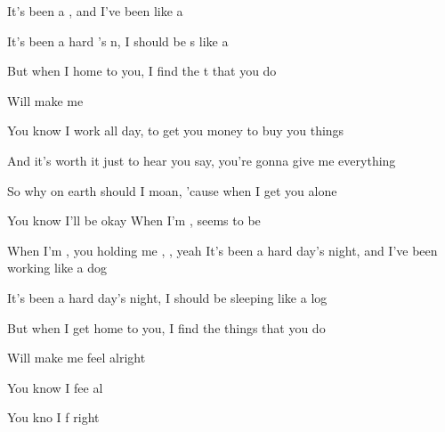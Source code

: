 


\zs

It's been a   , and I've been  like a 

It's been a hard 's n, I should be s like a

But when I  home to you, I find the t that you do

Will make me  
\ks
\zs

You know I work all day, to get you money to buy you things

And it's worth it just to hear you say, you're gonna give me everything

So why on earth should I moan, 'cause when I get you alone

You know I'll be okay
\ks
\zr
When I'm ,  seems to be 

When I'm ,  you holding me , , yeah
\kr
\zs
It's been a hard day's night, and I've been working like a dog

It's been a hard day's night, I should be sleeping like a log

But when I get home to you, I find the things that you do

Will make me feel alright

You know I fee al

You kno I f right 
\ks
\kp

